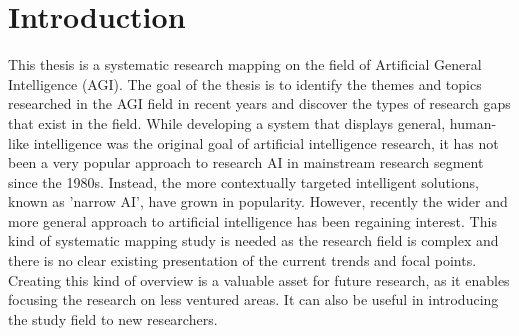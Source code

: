 
\author{Samu Kumpulainen}

\maketitle

\mainmatter

\chapter{Introduction}
This thesis is a systematic research mapping on the field of Artificial General
Intelligence (AGI). The goal of the thesis is to identify the themes and topics
researched in the AGI field in recent years and discover the types of research
gaps that exist in the field. While developing a system that displays general,
human-like intelligence was the original goal of artificial intelligence
research, it has not been a very popular approach to research AI in mainstream
research segment since the 1980s. Instead, the more contextually targeted
intelligent solutions, known as 'narrow AI', have grown in popularity. However,
recently the wider and more general approach to artificial intelligence has been
regaining interest. This kind of systematic mapping study is needed as the
research field is complex and there is no clear existing presentation of the
current trends and focal points. Creating this kind of overview is a valuable
asset for future research, as it enables focusing the research on less ventured
areas. It can also be useful in introducing the study field to new researchers.

